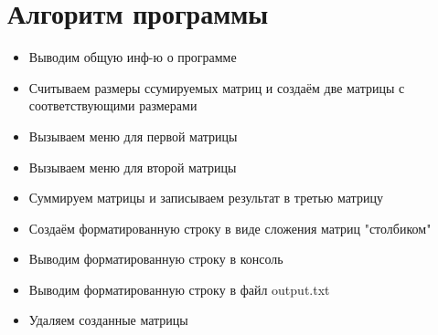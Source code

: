 \section*{Алгоритм программы}

\begin{itemize}
	\item Выводим общую инф-ю о программе
	\item Считываем размеры ссумируемых матриц и создаём две матрицы
	с соответствующими размерами
	\item Вызываем меню для первой матрицы
	\item Вызываем меню для второй матрицы
	\item Суммируем матрицы и записываем результат в третью матрицу
	\item Создаём форматированную строку в виде сложения матриц "столбиком"
	\item Выводим форматированную строку в консоль
	\item Выводим форматированную строку в файл output.txt
	\item Удаляем созданные матрицы
\end{itemize}